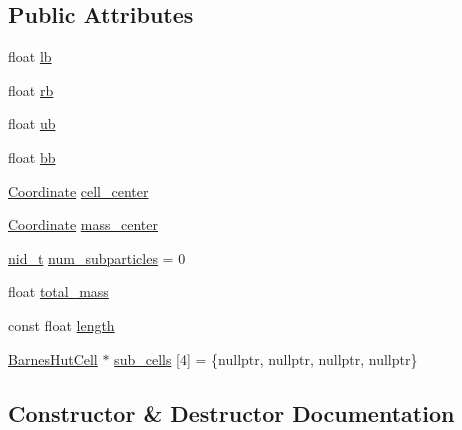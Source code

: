 \subsection*{Public Attributes}
\begin{DoxyCompactItemize}
\item 
float \mbox{\hyperlink{classRPGraph_1_1BarnesHutCell_a7ca6a9e4fb9fdabdb044b50543f17696}{lb}}
\item 
float \mbox{\hyperlink{classRPGraph_1_1BarnesHutCell_a8cbdd91ae4519d39950fda7876ec6807}{rb}}
\item 
float \mbox{\hyperlink{classRPGraph_1_1BarnesHutCell_abde44d393c2301e483165bd34d33b499}{ub}}
\item 
float \mbox{\hyperlink{classRPGraph_1_1BarnesHutCell_aded4b0bd6d7149025bcb61c2417a3340}{bb}}
\item 
\mbox{\hyperlink{classRPGraph_1_1Coordinate}{Coordinate}} \mbox{\hyperlink{classRPGraph_1_1BarnesHutCell_ad05182b30394a0fef58905fc780c6670}{cell\+\_\+center}}
\item 
\mbox{\hyperlink{classRPGraph_1_1Coordinate}{Coordinate}} \mbox{\hyperlink{classRPGraph_1_1BarnesHutCell_a708b00b04ecc6156ac3823d3144cee06}{mass\+\_\+center}}
\item 
\mbox{\hyperlink{namespaceRPGraph_ab3ae34f1ab88e48f43794c30c8697b74}{nid\+\_\+t}} \mbox{\hyperlink{classRPGraph_1_1BarnesHutCell_af7a014d2a466131d761c61133ca36590}{num\+\_\+subparticles}} = 0
\item 
float \mbox{\hyperlink{classRPGraph_1_1BarnesHutCell_aee255243a920b8193b6d0dc0c3d34525}{total\+\_\+mass}}
\item 
const float \mbox{\hyperlink{classRPGraph_1_1BarnesHutCell_a38c6272cc32669deeb151ec1f7931c73}{length}}
\item 
\mbox{\hyperlink{classRPGraph_1_1BarnesHutCell}{Barnes\+Hut\+Cell}} $\ast$ \mbox{\hyperlink{classRPGraph_1_1BarnesHutCell_a39ee11913115bdda26cb890059b43e79}{sub\+\_\+cells}} \mbox{[}4\mbox{]} = \{nullptr, nullptr, nullptr, nullptr\}
\end{DoxyCompactItemize}


\subsection{Constructor \& Destructor Documentation}
\mbox{\label{classRPGraph_1_1BarnesHutCell_aceaa103002fc446b55eef541dee3bdcf}} 
